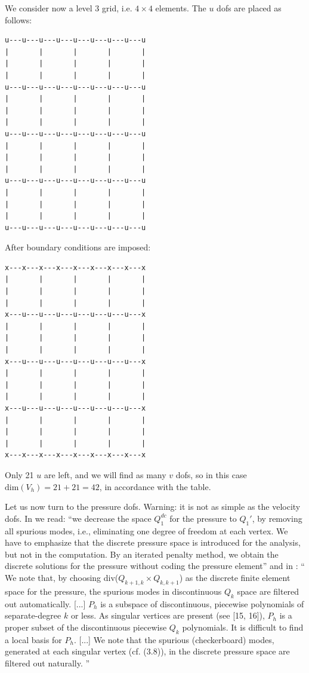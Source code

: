 \newpage
We consider now a level 3 grid, i.e. $4\times 4$ elements. 
The $u$ dofs are placed as follows:
\begin{verbatim}
u---u---u---u---u---u---u---u---u
|       |       |       |       |
|       |       |       |       |
|       |       |       |       |
u---u---u---u---u---u---u---u---u
|       |       |       |       |
|       |       |       |       |
|       |       |       |       |
u---u---u---u---u---u---u---u---u
|       |       |       |       |
|       |       |       |       |
|       |       |       |       |
u---u---u---u---u---u---u---u---u
|       |       |       |       |
|       |       |       |       |
|       |       |       |       |
u---u---u---u---u---u---u---u---u
\end{verbatim}
After boundary conditions are imposed:
\begin{verbatim}
x---x---x---x---x---x---x---x---x
|       |       |       |       |
|       |       |       |       |
|       |       |       |       |
x---u---u---u---u---u---u---u---x
|       |       |       |       |
|       |       |       |       |
|       |       |       |       |
x---u---u---u---u---u---u---u---x
|       |       |       |       |
|       |       |       |       |
|       |       |       |       |
x---u---u---u---u---u---u---u---x
|       |       |       |       |
|       |       |       |       |
|       |       |       |       |
x---x---x---x---x---x---x---x---x
\end{verbatim}
Only 21 $u$ are left, and we will find as many $v$ dofs, so in this case $\text{dim}(V_h)=21+21=42$,
in accordance with the table. 

Let us now turn to the pressure dofs. 
Warning: it is not as simple as the velocity dofs. 
In \textcite{huzh11} we read: {\color{darkgray} ``we decrease the space $Q_1^{dc}$ 
for the pressure to $Q_1'$, by removing all spurious modes, i.e.,
eliminating one degree of freedom at each vertex. We have to emphasize
that the discrete pressure space is introduced for the analysis, but not in the
computation. By an iterated penalty method, we obtain the discrete solutions
for the pressure without coding the pressure element''}
and in 
\textcite{zhan09}:
{\color{darkgray} ``
We note that, by choosing div($Q_{k+1,k}\times Q_{k,k+1}$) 
as the discrete ﬁnite element space for the pressure, the spurious
modes in discontinuous $Q_k$ space are filtered out automatically.
[...]
$P_h$ is a subspace of discontinuous, piecewise polynomials
of separate-degree $k$ or less. As singular vertices are present (see [15, 16]), 
$P_h$ is a proper subset of the discontinuous piecewise $Q_k$ 
polynomials. It is difficult to ﬁnd a local basis for $P_h$.
[...]
We note that the spurious (checkerboard) modes, generated at each 
singular vertex (cf. (3.8)), in the discrete pressure space are ﬁltered
out naturally.
''}

